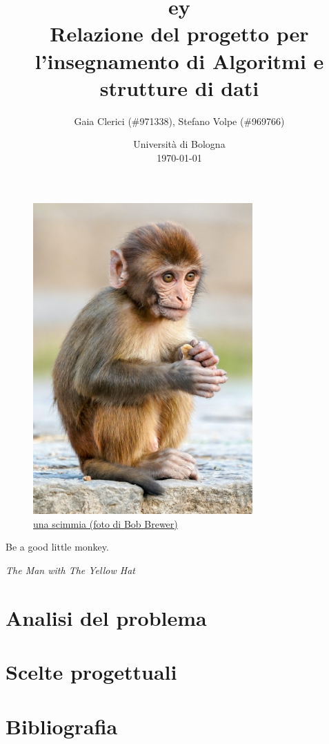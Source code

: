\documentclass[a4paper]{article}
\title{
  {
    \fontspec{Symbola}
    \symbol{"1F17C}
    \symbol{"1F435}
    \symbol{"1F17D}
    \symbol{"1F17A}
  }ey \\
  \small Relazione del progetto per l'insegnamento di Algoritmi e strutture di
  dati
}
\author{
  Gaia Clerici (\#971338),
  Stefano Volpe (\#969766)
}
\date{
	Universit\`a di Bologna \\
  \today
}
\begin{document}
\maketitle

\begin{figure}[h]
  \includegraphics[width=0.75\textwidth]{monkey}
  \centering
  \caption{\href{https://unsplash.com/photos/daC7ji1EMHM}{una scimmia
  (foto di Bob Brewer)}}
\end{figure}

\pagebreak

\epigraph{Be a good little monkey.}{\textit{The Man with The Yellow Hat}}

\section{Analisi del problema}

\section{Scelte progettuali}

\section{Bibliografia}
\end{document}
